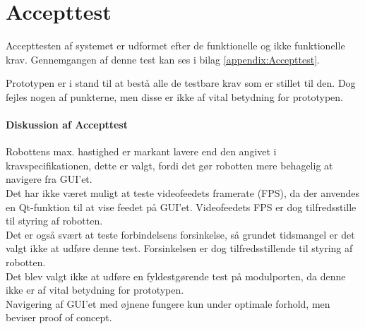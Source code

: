 %

\chapter{Accepttest}

Accepttesten af systemet er udformet efter de funktionelle og ikke funktionelle krav. Gennemgangen af denne test kan ses i bilag \ref{appendix:Accepttest}. 

Prototypen er i stand til at bestå alle de testbare krav som er stillet til den. 
Dog fejles nogen af punkterne, men disse er ikke af vital betydning for prototypen. 

\subsubsection{Diskussion af Accepttest}
Robottens max. hastighed er markant lavere end den angivet i kravspecifikationen, dette er valgt, fordi det gør robotten mere behagelig at navigere fra GUI'et.\\
Det har ikke været muligt at teste videofeedets framerate (FPS), da der anvendes en Qt-funktion til at vise feedet på GUI'et. 
Videofeedets FPS er dog tilfredsstille til styring af robotten.\\
Det er også svært at teste forbindelsens forsinkelse, så grundet tidsmangel er det valgt ikke at udføre denne test. 
Forsinkelsen er dog tilfredsstillende til styring af robotten.\\
Det blev valgt ikke at udføre en fyldestgørende test på modulporten, da denne ikke er af vital betydning for prototypen. \\
Navigering af GUI'et med øjnene fungere kun under optimale forhold, men beviser proof of concept.


%